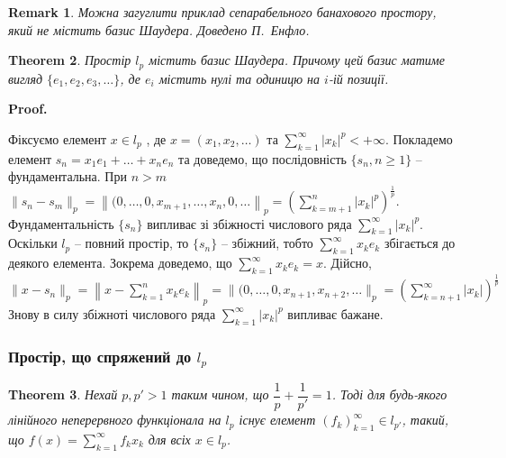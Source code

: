 \documentclass[a4paper, 10pt]{article}
\makeatletter
\theoremstyle{theoremdd}
\newtheorem{theorem}{Theorem}[subsection]
\theoremstyle{theoremdd}
\theoremstyle{theoremdd}
\theoremstyle{theoremdd}
\theoremstyle{theoremdd}
\theoremstyle{theoremdd}
\newtheorem{remark}[theorem]{Remark}
\theoremstyle{theoremdd}
\theoremstyle{theoremdd}
\renewenvironment{proof}[1][Proof.\\]{\par
\pushQED{\hfill \qed}%
\normalfont \topsep6\p@\@plus6\p@\relax
\trivlist
\item\relax
{\bfseries
#1\@addpunct{.}}\hspace\labelsep\ignorespaces
}{%
\popQED\endtrivlist\@endpefalse
}
\makeatother
\begin{document}
\begin{remark}
Можна загуглити приклад сепарабельного банахового простору, який не містить базис Шаудера. Доведено П.\ Енфло.
\end{remark}

\begin{theorem}
Простір $l_p$ містить базис Шаудера. Причому цей базис матиме вигляд $\{e_1,e_2,e_3,\dots\}$, де $e_i$ містить нулі та одиницю на $i$-ій позиції.
\end{theorem}

\begin{proof}
Фіксуємо елемент $x \in l_p$ , де $x = (x_1,x_2,\dots)$ та $\displaystyle\sum_{k=1}^\infty |x_k|^p < +\infty$. Покладемо елемент $s_n = x_1 e_1 + \dots + x_n e_n$ та доведемо, що послідовність $\{s_n, n \geq 1\}$ -- фундаментальна. При $n > m$\\
$\|s_n - s_m \|_p = \left\| (0,\dots,0,x_{m+1},\dots,x_n,0,\dots \right\|_p = \displaystyle \left( \sum_{k=m+1}^n |x_k|^p \right)^{\frac{1}{p}}$.\\
Фундаментальність $\{s_n\}$ випливає зі збіжності числового ряда $\displaystyle\sum_{k=1}^\infty |x_k|^p$. Оскільки $l_p$ -- повний простір, то $\{s_n\}$ -- збіжний, тобто $\displaystyle\sum_{k=1}^\infty x_k e_k$ збігається до деякого елемента. Зокрема доведемо, що $\displaystyle\sum_{k=1}^\infty x_k e_k = x$. Дійсно,\\
$\|x-s_n\|_p = \displaystyle \left\| x - \sum_{k=1}^n x_k e_k \right\|_p = \| (0,\dots,0,x_{n+1},x_{n+2},\dots \|_p = \left( \sum_{k=n+1}^\infty |x_k| \right)^{\frac{1}{p}}$\\
Знову в силу збіжноті числового ряда $\displaystyle\sum_{k=1}^\infty |x_k|^p$ випливає бажане.
\end{proof}

\subsubsection{Простір, що спряжений до $l_p$}
\begin{theorem}
Нехай $p,p' > 1$ таким чином, що $\dfrac{1}{p} + \dfrac{1}{p'} = 1$. Тоді для будь-якого лінійного неперервного функціонала на $l_p$ існує елемент $(f_k)_{k=1}^\infty \in l_{p'}$, такий, що $f(x) = \displaystyle\sum_{k=1}^\infty f_k x_k$ для всіх $x \in l_p$.
\end{theorem}
\end{document}
